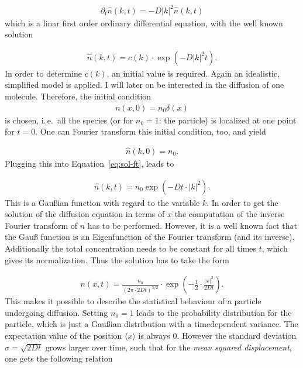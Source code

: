 \begin{align*}
  \partial_t \hat n(k,t) =  - D|k|^2 \hat n(k,t)
\end{align*}
which is a linar first order ordinary differential equation, with the
well known solution

\begin{align}
  \hat n(k,t) = c(k) \cdot \exp(-D|k|^2 t). \label{eq:sol-ft}
\end{align}
In order to determine $c(k)$, an initial value is required. Again an
idealistic, simplified model is applied. I will later on be interested
in the diffusion of one molecule. Therefore, the initial condition
\begin{align*}
  n(x,0) = n_0 \delta(x)
\end{align*}
is chosen, i.\,e.\ all the species (or for $n_0 = 1$: the particle) is
localized at one point for $t = 0$. One can Fourier transform this
initial condition, too, and yield

\begin{align*}
  \hat n(k,0) = n_0.
\end{align*}
Plugging this into Equation~\eqref{eq:sol-ft}, leads to

\begin{align*}
  \hat n(k,t) = n_0 \exp(-Dt \cdot |k|^2).
\end{align*}
This is a Gaußian function with regard to the variable $k$. In order
to get the solution of the diffusion equation in terms of $x$ the
computation of the inverse Fourier transform of $\hat n$ has to be
performed. However, it is a well known fact that the Gauß function is
an Eigenfunction of the Fourier transform (and its
inverse). Additionally the total concentration needs to be constant
for all times $t$, which gives its normalization. Thus the solution
has to take the form

\begin{align*}
  n(x,t) = \frac{n_0}{(2\pi \cdot 2Dt)^{3/2}} \cdot \exp \left(
  -\frac{1}{2} \cdot \frac{|x|^2}{2Dt} \right).
\end{align*}
This makes it possible to describe the statistical behaviour of a particle
undergoing diffusion. Setting $n_0 = 1$ leads to the probability
distribution for the particle, which is just a Gaußian distribution
with a timedependent variance. The expectation value of
the position $\langle x \rangle$ is always 0. However the standard
deviation $\sigma = \sqrt{2Dt}$ grows larger over time, such that for
the \emph{mean squared displacement}, one gets the following relation

